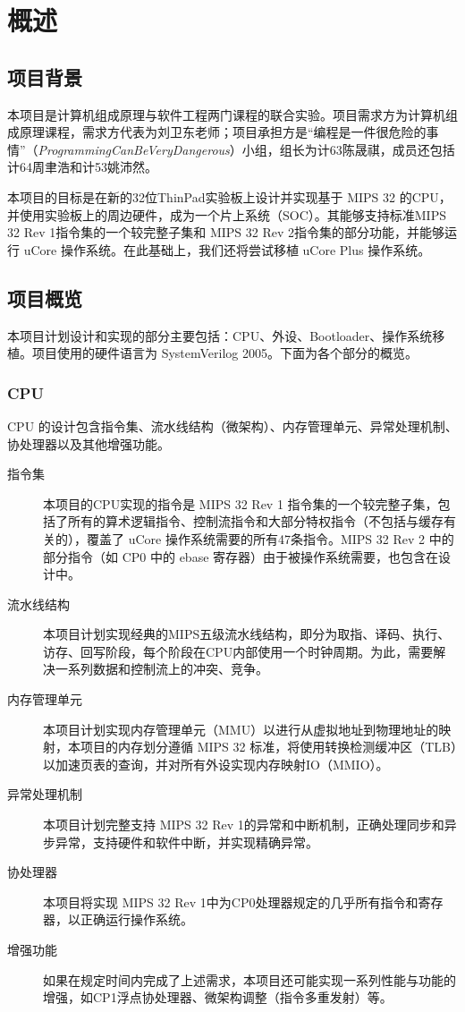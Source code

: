 \chapter{概述}

\section{项目背景}

本项目是计算机组成原理与软件工程两门课程的联合实验。项目需求方为计算机组成原理课程，需求方代表为刘卫东老师；项目承担方是“编程是一件很危险的事情”（\textit{ProgrammingCanBeVeryDangerous}）小组，组长为计63陈晟祺，成员还包括计64周聿浩和计53姚沛然。

本项目的目标是在新的32位ThinPad实验板上设计并实现基于 MIPS 32 的CPU，并使用实验板上的周边硬件，成为一个片上系统（SOC）。其能够支持标准MIPS 32 Rev 1指令集的一个较完整子集和 MIPS 32 Rev 2指令集的部分功能，并能够运行 uCore 操作系统。在此基础上，我们还将尝试移植 uCore Plus 操作系统。

\section{项目概览}

本项目计划设计和实现的部分主要包括：CPU、外设、Bootloader、操作系统移植。项目使用的硬件语言为 SystemVerilog 2005。下面为各个部分的概览。

\subsection{CPU}

CPU 的设计包含指令集、流水线结构（微架构）、内存管理单元、异常处理机制、协处理器以及其他增强功能。

\begin{description}

    \item[指令集] 本项目的CPU实现的指令是 MIPS 32 Rev 1 指令集的一个较完整子集，包括了所有的算术逻辑指令、控制流指令和大部分特权指令（不包括与缓存有关的），覆盖了 uCore 操作系统需要的所有47条指令。MIPS 32 Rev 2 中的部分指令（如 CP0 中的 ebase 寄存器）由于被操作系统需要，也包含在设计中。
    \item[流水线结构] 本项目计划实现经典的MIPS五级流水线结构，即分为取指、译码、执行、访存、回写阶段，每个阶段在CPU内部使用一个时钟周期。为此，需要解决一系列数据和控制流上的冲突、竞争。
    \item[内存管理单元] 本项目计划实现内存管理单元（MMU）以进行从虚拟地址到物理地址的映射，本项目的内存划分遵循 MIPS 32 标准，将使用转换检测缓冲区（TLB）以加速页表的查询，并对所有外设实现内存映射IO（MMIO）。
    \item[异常处理机制] 本项目计划完整支持 MIPS 32 Rev 1的异常和中断机制，正确处理同步和异步异常，支持硬件和软件中断，并实现精确异常。
    \item[协处理器] 本项目将实现 MIPS 32 Rev 1中为CP0处理器规定的几乎所有指令和寄存器，以正确运行操作系统。
    \item[增强功能] 如果在规定时间内完成了上述需求，本项目还可能实现一系列性能与功能的增强，如CP1浮点协处理器、微架构调整（指令多重发射）等。

\end{description}

